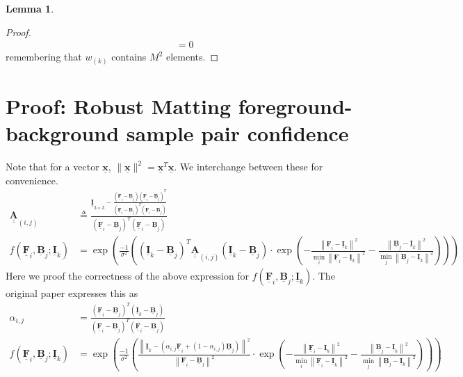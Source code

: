 \documentclass{article}
\theoremstyle{definition}
\newtheorem{lemma}[theorem]{Lemma}
\def\vt#1{\underline{\mathbf{#1}}}
\def\vts#1{\underline{\boldsymbol{#1}}}
\def\mt#1{\underline{\underline{\mathbf{#1}}}}
\def\mts#1{\underline{\underline{\boldsymbol{#1}}}}
\begin{document}
\begin{lemma}
\begin{proof}
\begin{align*}
            &= 0
        \end{align*}
        remembering that $w_{(k)}$ contains $M^2$ elements.
    \end{proof}
\end{lemma}




\newpage
\section{Proof: Robust Matting foreground-background sample pair confidence} \label{appendix:robust-confidence}
Note that for a vector $\vt x$, $\|\vt x\|^2 = \vt x^T\vt x$. We interchange between these for convenience.
\begin{align*}
    \mt A_{(i,j)} &\triangleq \frac{\mt I_{3\times 3} -  \frac{\left(\vt F_i - \vt B_j\right)\left(\vt F_i - \vt B_j\right)^T}{\left(\vt F_i - \vt B_j\right)^T\left(\vt F_i - \vt B_j\right)}}{\left(\vt F_i - \vt B_j\right)^T\left(\vt F_i - \vt B_j\right)} \\
    f(\vt F_i, \vt B_j; \vt I_k) &= \exp\left(\frac{-1}{\sigma^2} \left(
        \left(\vt I_k - \vt B_j \right)^T \mt A_{(i,j)}\left(\vt I_k - \vt B_j \right) \cdot \exp\left(  -\frac{\left\| \vt F_i - \vt I_k \right\|^2}{\min_i \left\| \vt F_i - \vt I_k \right\|^2} - \frac{\left\| \vt B_j - \vt I_k \right\|^2}{\min_j \left\| \vt B_j - \vt I_k \right\|^2} \right)
        \right)\right)
\end{align*}
Here we proof the correctness of the above expression for $f(\vt F_i, \vt B_j; \vt I_k)$. The original paper expresses this as
\begin{align*}
    \alpha_{i,j} &= \frac{\left(\vt F_i - \vt B_j\right)^T\left(\vt I_k - \vt B_j\right)}{\left(\vt F_i - \vt B_j\right)^T\left(\vt F_i - \vt B_j\right)} \\
    f(\vt F_i, \vt B_j; \vt I_k) &= \exp\left(\frac{-1}{\sigma^2} \left(
        \frac{\left\| \vt I_k - \left( \alpha_{i,j}\vt F_i + (1-\alpha_{i,j})\vt B_j\right)  \right\|^2}{\left\| \vt F_i - \vt B_j \right\|^2} \cdot \exp\left(  -\frac{\left\| \vt F_i - \vt I_k \right\|^2}{\min_i \left\| \vt F_i - \vt I_k \right\|^2} - \frac{\left\| \vt B_j - \vt I_k \right\|^2}{\min_j \left\| \vt B_j - \vt I_k \right\|^2} \right)
    \right)\right)
\end{align*}
\end{document}
